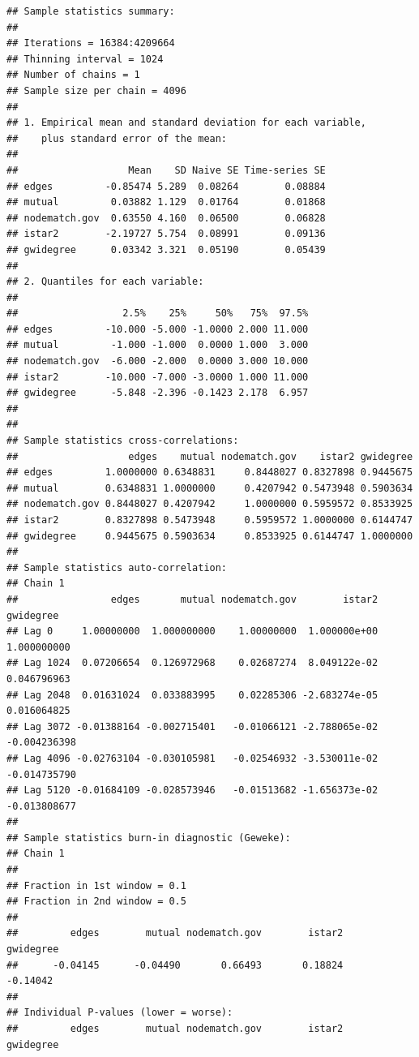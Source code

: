\documentclass[12pt, letterpaper, notitlepage, onecolumn, twoside, openbib]{article}\usepackage[]{graphicx}\usepackage[]{color}
\makeatletter
\newenvironment{kframe}{%
 \def\at@end@of@kframe{}%
 \ifinner\ifhmode%
  \def\at@end@of@kframe{\end{minipage}}%
  \begin{minipage}{\columnwidth}%
 \fi\fi%
 \def\FrameCommand##1{\hskip\@totalleftmargin \hskip-\fboxsep
 \colorbox{shadecolor}{##1}\hskip-\fboxsep
     \hskip-\linewidth \hskip-\@totalleftmargin \hskip\columnwidth}%
 \MakeFramed {\advance\hsize-\width
   \@totalleftmargin\z@ \linewidth\hsize
   \@setminipage}}%
 {\par\unskip\endMakeFramed%
 \at@end@of@kframe}
\newenvironment{knitrout}{}{} %
\makeatother
\begin{document}
\begin{knitrout}
\color{fgcolor}\begin{kframe}
\begin{verbatim}
## Sample statistics summary:
## 
## Iterations = 16384:4209664
## Thinning interval = 1024 
## Number of chains = 1 
## Sample size per chain = 4096 
## 
## 1. Empirical mean and standard deviation for each variable,
##    plus standard error of the mean:
## 
##                   Mean    SD Naive SE Time-series SE
## edges         -0.85474 5.289  0.08264        0.08884
## mutual         0.03882 1.129  0.01764        0.01868
## nodematch.gov  0.63550 4.160  0.06500        0.06828
## istar2        -2.19727 5.754  0.08991        0.09136
## gwidegree      0.03342 3.321  0.05190        0.05439
## 
## 2. Quantiles for each variable:
## 
##                  2.5%    25%     50%   75%  97.5%
## edges         -10.000 -5.000 -1.0000 2.000 11.000
## mutual         -1.000 -1.000  0.0000 1.000  3.000
## nodematch.gov  -6.000 -2.000  0.0000 3.000 10.000
## istar2        -10.000 -7.000 -3.0000 1.000 11.000
## gwidegree      -5.848 -2.396 -0.1423 2.178  6.957
## 
## 
## Sample statistics cross-correlations:
##                   edges    mutual nodematch.gov    istar2 gwidegree
## edges         1.0000000 0.6348831     0.8448027 0.8327898 0.9445675
## mutual        0.6348831 1.0000000     0.4207942 0.5473948 0.5903634
## nodematch.gov 0.8448027 0.4207942     1.0000000 0.5959572 0.8533925
## istar2        0.8327898 0.5473948     0.5959572 1.0000000 0.6144747
## gwidegree     0.9445675 0.5903634     0.8533925 0.6144747 1.0000000
## 
## Sample statistics auto-correlation:
## Chain 1 
##                edges       mutual nodematch.gov        istar2    gwidegree
## Lag 0     1.00000000  1.000000000    1.00000000  1.000000e+00  1.000000000
## Lag 1024  0.07206654  0.126972968    0.02687274  8.049122e-02  0.046796963
## Lag 2048  0.01631024  0.033883995    0.02285306 -2.683274e-05  0.016064825
## Lag 3072 -0.01388164 -0.002715401   -0.01066121 -2.788065e-02 -0.004236398
## Lag 4096 -0.02763104 -0.030105981   -0.02546932 -3.530011e-02 -0.014735790
## Lag 5120 -0.01684109 -0.028573946   -0.01513682 -1.656373e-02 -0.013808677
## 
## Sample statistics burn-in diagnostic (Geweke):
## Chain 1 
## 
## Fraction in 1st window = 0.1
## Fraction in 2nd window = 0.5 
## 
##         edges        mutual nodematch.gov        istar2     gwidegree 
##      -0.04145      -0.04490       0.66493       0.18824      -0.14042 
## 
## Individual P-values (lower = worse):
##         edges        mutual nodematch.gov        istar2     gwidegree 

\end{verbatim}
\end{kframe}
\end{knitrout}
\end{document}
